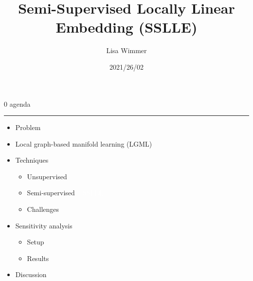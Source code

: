 \documentclass[11pt, compress, t, notes = noshow, xcolor = table, 
aspectratio = 1610]{beamer}
\title{Semi-Supervised Locally Linear Embedding (SSLLE)}
\author{Lisa Wimmer}
\date{2021/26/02}
\newcommand{\maketag}[1]{\colorbox{highlightcol}{\textcolor{white}
{\MakeUppercase{#1}}}}
\newcommand{\highlight}[1]{\textcolor{highlightcol}{\textbf{#1}}}
\newcommand{\flexitem}[1]{\item[$\highlight{#1}$]}
\begin{document}


\LARGE
\begin{frame}{\textcolor{gray!90}{0 agenda}}
\normalsize
\vspace{-0.5cm}
\noindent \textcolor{gray!90}{\rule{\textwidth}{1pt}}
\smallskip

\begin{itemize}
\large
\flexitem{1} Problem
\flexitem{2} Local graph-based manifold learning (LGML)
\flexitem{3} Techniques
\begin{itemize}
  \large
  \flexitem{1} Unsupervised
  \flexitem{2} Semi-supervised ~ \maketag{SSLLE}
  \flexitem{3} Challenges
\end{itemize}
\flexitem{4} Sensitivity analysis
\begin{itemize}
  \large
  \flexitem{1} Setup
  \flexitem{2} Results
\end{itemize}
\flexitem{5} Discussion
\end{itemize}

\end{frame}

\end{document}
